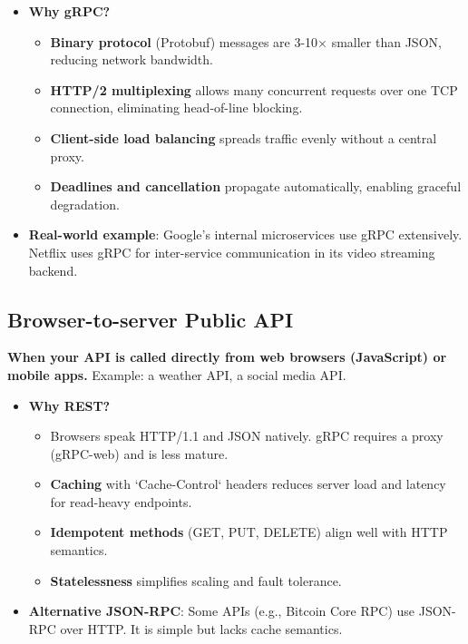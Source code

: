 \documentclass[10pt,a4paper]{article}
\begin{document}
\begin{itemize}
    \item \textbf{Why gRPC?} 
        \begin{itemize}
            \item \textbf{Binary protocol} (Protobuf) messages are 3-10× smaller than JSON, reducing network bandwidth.
            \item \textbf{HTTP/2 multiplexing} allows many concurrent requests over one TCP connection, eliminating head-of-line blocking.
            \item \textbf{Client-side load balancing} spreads traffic evenly without a central proxy.
            \item \textbf{Deadlines and cancellation} propagate automatically, enabling graceful degradation.
        \end{itemize}
    \item \textbf{Real-world example}: Google’s internal microservices use gRPC extensively. Netflix uses gRPC for inter-service communication in its video streaming backend.
\end{itemize}

\subsection{Browser-to-server Public API}
\textbf{When your API is called directly from web browsers (JavaScript) or mobile apps.} Example: a weather API, a social media API.

\begin{itemize}
    \item \textbf{Why REST?}
        \begin{itemize}
            \item Browsers speak HTTP/1.1 and JSON natively. gRPC requires a proxy (gRPC-web) and is less mature.
            \item \textbf{Caching} with `Cache-Control` headers reduces server load and latency for read-heavy endpoints.
            \item \textbf{Idempotent methods} (GET, PUT, DELETE) align well with HTTP semantics.
            \item \textbf{Statelessness} simplifies scaling and fault tolerance.
        \end{itemize}
    \item \textbf{Alternative JSON-RPC}: Some APIs (e.g., Bitcoin Core RPC) use JSON-RPC over HTTP. It is simple but lacks cache semantics.
\end{itemize}
\end{document}
